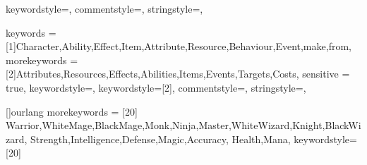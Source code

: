 
{
	keywordstyle=\color{blue},          %
	commentstyle=\color{dkgreen},       %
	stringstyle=\color{mauve},         %
}

{
	keywords = {[1]Character,Ability,Effect,Item,Attribute,Resource,Behaviour,Event,make,from},
	morekeywords = {[2]Attributes,Resources,Effects,Abilities,Items,Events,Targets,Costs},
	sensitive = true,
	keywordstyle=\color{blue},          %
	keywordstyle={[2]\color{dkgreen}},
	commentstyle=\color{dkgreen},       %
	stringstyle=\color{mauve},         %
}

[]{ourlang}
{
	morekeywords = [20]{
		Warrior,WhiteMage,BlackMage,Monk,Ninja,Master,WhiteWizard,Knight,BlackWizard,
		Strength,Intelligence,Defense,Magic,Accuracy,
		Health,Mana},
	keywordstyle={[20]\color{orange}}
}